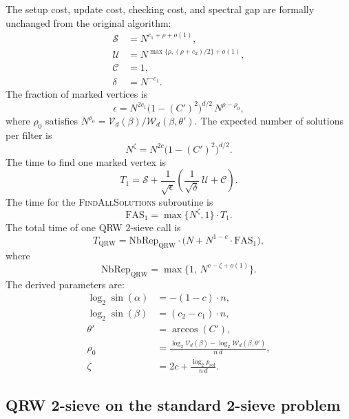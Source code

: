 \documentclass[10pt,a4paper]{article}
\begin{document}
The setup cost, update cost, checking cost, and spectral gap are formally unchanged from the original algorithm:
\begin{align}
\mathcal{S} &= N^{c_1+\rho+o(1)}, \\
\mathcal{U} &= N^{\max\{\rho,(\rho+c_2)/2\}+o(1)}, \\
\mathcal{C} &= 1, \\
\delta &= N^{-c_1}.
\end{align}
The fraction of marked vertices is
\begin{equation}
\epsilon = N^{2c_1}\bigl(1-(C')^2\bigr)^{d/2}\,N^{\rho-\rho_0},
\end{equation}
where \(\rho_0\) satisfies \(N^{\rho_0} = \mathcal{V}_d(\beta)/\mathcal{W}_d(\beta,\theta')\). The expected number of solutions per filter is
\begin{equation}
N^\zeta = N^{2c}\bigl(1-(C')^2\bigr)^{d/2}.
\end{equation}
The time to find one marked vertex is
\begin{equation}
T_1 = \mathcal{S} + \frac{1}{\sqrt{\epsilon}}\left(\frac{1}{\sqrt{\delta}}\,\mathcal{U} + \mathcal{C}\right).
\label{eq:T1}
\end{equation}
The time for the \textsc{FindAllSolutions} subroutine is
\begin{equation}
\mathrm{FAS}_1 = \max\{N^\zeta, 1\}\cdot T_1.
\label{eq:FAS1}
\end{equation}
The total time of one QRW 2-sieve call is
\begin{equation}
T_{\mathrm{QRW}} = \mathrm{NbRep}_{\mathrm{QRW}}\cdot\bigl(N + N^{1-c}\cdot \mathrm{FAS}_1\bigr),
\label{eq:TQRW}
\end{equation}
where
\begin{equation}
\mathrm{NbRep}_{\mathrm{QRW}} = \max\bigl\{1,\, N^{c-\zeta+o(1)}\bigr\}.
\label{eq:NbRepQRW}
\end{equation}
The derived parameters are:
\begin{align}
\log_2 \sin(\alpha) &= -(1-c)\cdot n, \\
\log_2 \sin(\beta) &= (c_2-c_1)\cdot n, \\
\theta' &= \arccos(C'), \\
\rho_0 &= \frac{\log_2 \mathcal{V}_d(\beta) - \log_2 \mathcal{W}_d(\beta,\theta')}{n\,d}, \\
\zeta &= 2c + \frac{\log_2 p_{\mathrm{sol}}}{n\,d}.
\end{align}

\subsection{QRW 2-sieve on the standard 2-sieve problem}
\end{document}
